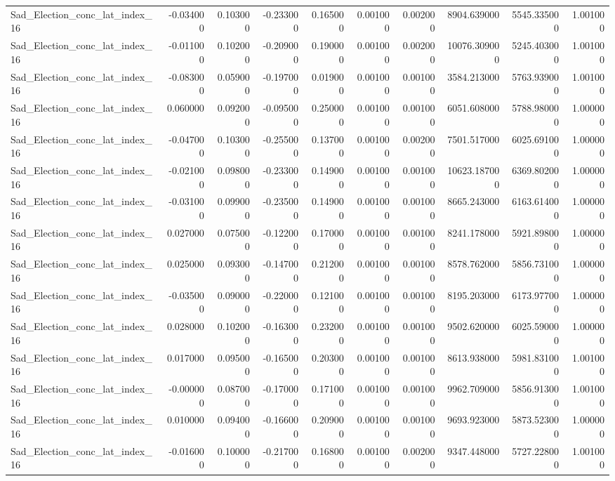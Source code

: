 \begin{table}
\begin{tabular}{lrrrrrrrrr}
Sad_Election_conc_lat_index_16 & -0.034000 & 0.103000 & -0.233000 & 0.165000 & 0.001000 & 0.002000 & 8904.639000 & 5545.335000 & 1.001000 \\
Sad_Election_conc_lat_index_16 & -0.011000 & 0.102000 & -0.209000 & 0.190000 & 0.001000 & 0.002000 & 10076.309000 & 5245.403000 & 1.001000 \\
Sad_Election_conc_lat_index_16 & -0.083000 & 0.059000 & -0.197000 & 0.019000 & 0.001000 & 0.001000 & 3584.213000 & 5763.939000 & 1.001000 \\
Sad_Election_conc_lat_index_16 & 0.060000 & 0.092000 & -0.095000 & 0.250000 & 0.001000 & 0.001000 & 6051.608000 & 5788.980000 & 1.000000 \\
Sad_Election_conc_lat_index_16 & -0.047000 & 0.103000 & -0.255000 & 0.137000 & 0.001000 & 0.002000 & 7501.517000 & 6025.691000 & 1.000000 \\
Sad_Election_conc_lat_index_16 & -0.021000 & 0.098000 & -0.233000 & 0.149000 & 0.001000 & 0.001000 & 10623.187000 & 6369.802000 & 1.000000 \\
Sad_Election_conc_lat_index_16 & -0.031000 & 0.099000 & -0.235000 & 0.149000 & 0.001000 & 0.001000 & 8665.243000 & 6163.614000 & 1.000000 \\
Sad_Election_conc_lat_index_16 & 0.027000 & 0.075000 & -0.122000 & 0.170000 & 0.001000 & 0.001000 & 8241.178000 & 5921.898000 & 1.000000 \\
Sad_Election_conc_lat_index_16 & 0.025000 & 0.093000 & -0.147000 & 0.212000 & 0.001000 & 0.001000 & 8578.762000 & 5856.731000 & 1.000000 \\
Sad_Election_conc_lat_index_16 & -0.035000 & 0.090000 & -0.220000 & 0.121000 & 0.001000 & 0.001000 & 8195.203000 & 6173.977000 & 1.000000 \\
Sad_Election_conc_lat_index_16 & 0.028000 & 0.102000 & -0.163000 & 0.232000 & 0.001000 & 0.001000 & 9502.620000 & 6025.590000 & 1.000000 \\
Sad_Election_conc_lat_index_16 & 0.017000 & 0.095000 & -0.165000 & 0.203000 & 0.001000 & 0.001000 & 8613.938000 & 5981.831000 & 1.001000 \\
Sad_Election_conc_lat_index_16 & -0.000000 & 0.087000 & -0.170000 & 0.171000 & 0.001000 & 0.001000 & 9962.709000 & 5856.913000 & 1.001000 \\
Sad_Election_conc_lat_index_16 & 0.010000 & 0.094000 & -0.166000 & 0.209000 & 0.001000 & 0.001000 & 9693.923000 & 5873.523000 & 1.000000 \\
Sad_Election_conc_lat_index_16 & -0.016000 & 0.100000 & -0.217000 & 0.168000 & 0.001000 & 0.002000 & 9347.448000 & 5727.228000 & 1.001000 \\

\end{tabular}
\end{table}
